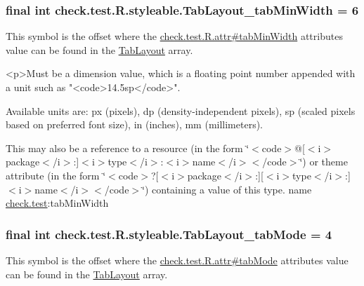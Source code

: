 \subsubsection[{Tab\+Layout\+\_\+tab\+Min\+Width}]{\setlength{\rightskip}{0pt plus 5cm}final int check.\+test.\+R.\+styleable.\+Tab\+Layout\+\_\+tab\+Min\+Width = 6\hspace{0.3cm}{\ttfamily [static]}}\label{classcheck_1_1test_1_1_r_1_1styleable_aa3b9b9d3b5f02ead0c41b9100556ca2a}
This symbol is the offset where the \hyperlink{classcheck_1_1test_1_1_r_1_1attr_ad78063e863c2df7fa0fdcc6222541690}{check.\+test.\+R.\+attr\#tab\+Min\+Width} attribute\textquotesingle{}s value can be found in the \hyperlink{classcheck_1_1test_1_1_r_1_1styleable_a2a3232e8d38a43f5131a16385abbbed8}{Tab\+Layout} array.

\begin{DoxyVerb}      <p>Must be a dimension value, which is a floating point number appended with a unit such as "<code>14.5sp</code>".
\end{DoxyVerb}
 Available units are\+: px (pixels), dp (density-\/independent pixels), sp (scaled pixels based on preferred font size), in (inches), mm (millimeters). 

This may also be a reference to a resource (in the form \char`\"{}$<$code$>$@\mbox{[}$<$i$>$package$<$/i$>$\+:\mbox{]}$<$i$>$type$<$/i$>$\+:$<$i$>$name$<$/i$>$$<$/code$>$\char`\"{}) or theme attribute (in the form \char`\"{}$<$code$>$?\mbox{[}$<$i$>$package$<$/i$>$\+:\mbox{]}\mbox{[}$<$i$>$type$<$/i$>$\+:\mbox{]}$<$i$>$name$<$/i$>$$<$/code$>$\char`\"{}) containing a value of this type.  name \hyperlink{namespacecheck_1_1test}{check.\+test}\+:tab\+Min\+Width \hypertarget{classcheck_1_1test_1_1_r_1_1styleable_a88d621242008fb6057c34ed8469247ae}{}
\subsubsection[{Tab\+Layout\+\_\+tab\+Mode}]{\setlength{\rightskip}{0pt plus 5cm}final int check.\+test.\+R.\+styleable.\+Tab\+Layout\+\_\+tab\+Mode = 4\hspace{0.3cm}{\ttfamily [static]}}\label{classcheck_1_1test_1_1_r_1_1styleable_a88d621242008fb6057c34ed8469247ae}
This symbol is the offset where the \hyperlink{classcheck_1_1test_1_1_r_1_1attr_a813adba1ffde6ec58ce835911d9db617}{check.\+test.\+R.\+attr\#tab\+Mode} attribute\textquotesingle{}s value can be found in the \hyperlink{classcheck_1_1test_1_1_r_1_1styleable_a2a3232e8d38a43f5131a16385abbbed8}{Tab\+Layout} array.

